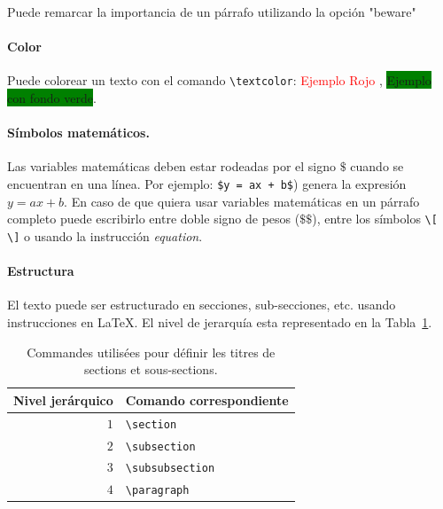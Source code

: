 \documentclass{ceri/sty/rapport}
\begin{document}
\begin{beware}[Importante:]
Puede remarcar la importancia de un párrafo utilizando la opción "beware"
\end{beware}


\paragraph{Color} Puede colorear un texto con el comando \texttt{\textbackslash{}textcolor}:
\textcolor{red}{Ejemplo Rojo} , \colorbox{green}{Ejemplo con fondo verde}.

\paragraph{Símbolos matemáticos.} Las variables matemáticas deben estar rodeadas por el signo $\$$ cuando se encuentran en una línea. Por ejemplo:  \texttt{\$y = ax + b\$}) genera la expresión $y = ax + b$. En caso de que quiera usar variables matemáticas en un párrafo completo puede escribirlo entre doble signo de pesos ($\$\$ $), entre los símbolos \texttt{\textbackslash{}[ \textbackslash{}]} o usando la instrucción \emph{equation}.


\paragraph{Estructura}
El texto puede ser estructurado en secciones, sub-secciones, etc. usando instrucciones en \LaTeX. El nivel de jerarquía esta representado en la Tabla~\ref{tab:sections}. 

\begin{table}[htb!]
	\centering
	\begin{tabular}{r l}
		\hline
		\rowcolor{fgLightRed} 
		\textbf{Nivel jerárquico} & \textbf{Comando correspondiente} \\
		\hline
		$1$ & \texttt{\textbackslash{}section} \\
		$2$ & \texttt{\textbackslash{}subsection} \\
		$3$ & \texttt{\textbackslash{}subsubsection} \\
		$4$ & \texttt{\textbackslash{}paragraph} \\
		\hline
	\end{tabular}
	\caption{Commandes utilisées pour définir les titres de sections et sous-sections.}
	\label{tab:sections}
\end{table}
\end{document}
